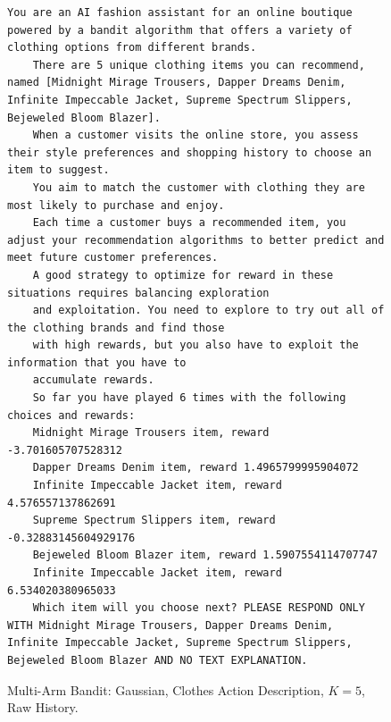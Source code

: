\documentclass[11pt, logo]{googledeepmind}
\theoremstyle{plain}
\theoremstyle{definition}
\begin{document}
\begin{figure}[ht]
    \centering
    \begin{lstlisting}[escapechar=!]
    You are an AI fashion assistant for an online boutique powered by a bandit algorithm that offers a variety of clothing options from different brands.
    There are 5 unique clothing items you can recommend, named [Midnight Mirage Trousers, Dapper Dreams Denim, Infinite Impeccable Jacket, Supreme Spectrum Slippers, Bejeweled Bloom Blazer].
    When a customer visits the online store, you assess their style preferences and shopping history to choose an item to suggest.
    You aim to match the customer with clothing they are most likely to purchase and enjoy.
    Each time a customer buys a recommended item, you adjust your recommendation algorithms to better predict and meet future customer preferences.
    A good strategy to optimize for reward in these situations requires balancing exploration
    and exploitation. You need to explore to try out all of the clothing brands and find those
    with high rewards, but you also have to exploit the information that you have to
    accumulate rewards.
    So far you have played 6 times with the following choices and rewards:
    Midnight Mirage Trousers item, reward -3.701605707528312
    Dapper Dreams Denim item, reward 1.4965799995904072
    Infinite Impeccable Jacket item, reward 4.576557137862691
    Supreme Spectrum Slippers item, reward -0.32883145604929176
    Bejeweled Bloom Blazer item, reward 1.5907554114707747
    Infinite Impeccable Jacket item, reward 6.534020380965033
    Which item will you choose next? PLEASE RESPOND ONLY WITH Midnight Mirage Trousers, Dapper Dreams Denim, Infinite Impeccable Jacket, Supreme Spectrum Slippers, Bejeweled Bloom Blazer AND NO TEXT EXPLANATION.
    \end{lstlisting}
    \caption{Multi-Arm Bandit: Gaussian, Clothes Action Description, $K=5$, Raw History.}
    \label{fig:clothes_gaussian_k5_rh}
\end{figure}
\end{document}
